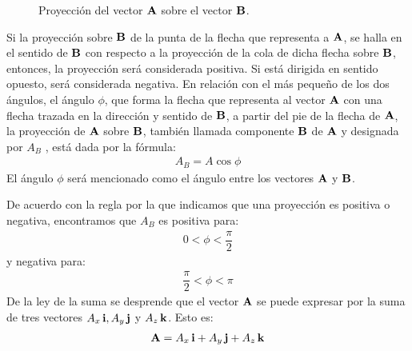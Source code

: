 \begin{figure}[H]
    \centering
    \caption{Proyección del vector $\vb{A}$ sobre el vector $\vb{B}$.}
    \label{fig:figura_01_06}
\end{figure}
Si la proyección sobre $\vb{B}$ de la punta de la flecha que representa a $\vb{A}$, se halla en el sentido de $\vb{B}$ con respecto a la proyección de la cola de dicha flecha sobre $\vb{B}$, entonces, la proyección será considerada positiva. Si está dirigida en sentido opuesto, será considerada negativa. En relación con el más pequeño de los dos ángulos, el ángulo $\phi$, que forma la flecha que representa al vector $\vb{A}$ con una flecha trazada en la dirección y sentido de $\vb{B}$, a partir del pie de la flecha de $\vb{A}$, la proyección de $\vb{A}$ sobre $\vb{B}$, también llamada componente $\vb{B}$ de $\vb{A}$ y designada por $A_{B}$ , está dada por la fórmula:
\begin{align}
    A_{B} = A \cos \phi
    \label{eq:ecuacion_01_06}
\end{align}
El ángulo $\phi$ será mencionado como el ángulo entre los vectores $\vb{A}$ y $\vb{B}$. 
\par
De acuerdo con la regla por la que indicamos que una proyección es positiva o negativa, encontramos que $A_{B}$ es positiva para:
\begin{align*}
    0 < \phi < \dfrac{\pi}{2}
\end{align*}
y negativa para:
\begin{align*}
    \dfrac{\pi}{2} < \phi < \pi
\end{align*}
De la ley de la suma se desprende que el vector $\vb{A}$ se puede expresar por la suma de tres vectores $A_{x} \, \vb{i}, A_{y} \, \vb{j}$ y $A_{z} \, \vb{k}$. Esto es:
\begin{align}
    \vb{A} = A_{x} \, \vb{i} + A_{y} \, \vb{j} + A_{z} \, \vb{k}
    \label{eq:ecuacion_01_07}
\end{align}
